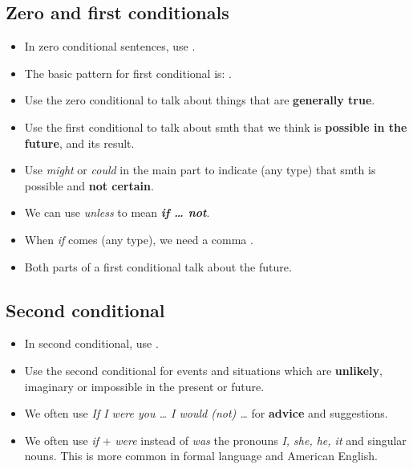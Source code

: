 \subsection{Zero and first conditionals}
\begin{itemize}
    \item In zero conditional sentences, use .
    \item The basic pattern for first conditional is:
    .
    \item Use the zero conditional to talk about things that are \textbf{generally true}.
    \item Use the first conditional to talk about smth that we think is \textbf{possible in the future},
    and its result.
    \item Use \textit{might} or \textit{could} in the main part to indicate (any type)
    that smth is possible and \textbf{not certain}.
    \item We can use \textit{unless} to mean \textbf{\textit{if \ldots{} not}}.
    \item When \textit{if} comes  (any type), we need a comma .
    \item[\ast] Both parts of a first conditional talk about the future.
\end{itemize}

\subsection{Second conditional}
\begin{itemize}
    \item In second conditional, use .
    \item Use the second conditional for events and situations
    which are \textbf{unlikely}, imaginary or impossible in the present or future.
    \item We often use \textit{If I were you \ldots{} I would (not) \ldots} for \textbf{advice} and suggestions.
    \item We often use \textit{if} + \textit{were} instead of \textit{was}
     the pronouns \textit{I, she, he, it} and singular nouns.
    This is more common in formal language and American English.
\end{itemize}